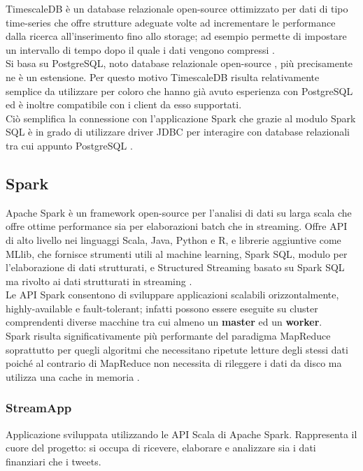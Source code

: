 TimescaleDB è un database relazionale open-source ottimizzato per dati di tipo time-series
che offre strutture adeguate volte ad incrementare le performance dalla ricerca
all'inserimento fino allo storage; ad esempio permette di impostare un intervallo di tempo
dopo il quale i dati vengono compressi \cite{timescale}.
\\
Si basa su PostgreSQL, noto database relazionale open-source \cite{postgresql}, più precisamente
ne è un estensione. Per questo motivo TimescaleDB risulta relativamente semplice da utilizzare
per coloro che hanno già avuto esperienza con PostgreSQL ed è inoltre compatibile con i client
da esso supportati.
\\
Ciò semplifica la connessione con l'applicazione Spark che grazie al modulo Spark SQL è in grado
di utilizzare driver JDBC per interagire con database relazionali tra cui appunto PostgreSQL
\cite{spark_sql}.

\subsection{Spark}

Apache Spark è un framework open-source per l'analisi di dati su larga scala che offre ottime
performance sia per elaborazioni batch che in streaming. Offre API di alto livello nei linguaggi
Scala, Java, Python e R, e librerie aggiuntive come MLlib, che fornisce strumenti utili al
machine learning, Spark SQL, modulo per l'elaborazione di dati strutturati,
e Structured Streaming basato su Spark SQL ma rivolto ai dati strutturati in streaming \cite{spark}.
\\
Le API Spark consentono di sviluppare applicazioni scalabili orizzontalmente, highly-available
e fault-tolerant; infatti possono
essere eseguite su cluster comprendenti diverse macchine tra cui almeno un \textbf{master} ed un
\textbf{worker}.
\\
Spark risulta significativamente più performante del paradigma MapReduce soprattutto per quegli algoritmi
che necessitano ripetute letture degli stessi dati poiché al contrario di MapReduce non
necessita di rileggere i dati da disco ma utilizza una cache in memoria \cite{spark_mapred}.

\subsubsection{StreamApp}

Applicazione sviluppata utilizzando le API Scala di Apache Spark. Rappresenta il cuore del progetto:
si occupa di ricevere, elaborare e analizzare sia i dati finanziari che i tweets.

